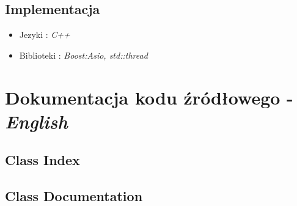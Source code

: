 \documentclass[11pt,oneside]{book}
\newcommand{\+}{\discretionary{\mbox{\scriptsize$\hookleftarrow$}}{}{}}
\begin{document}
\chapter{Implementacja}
\begin{itemize}
\item
Jezyki : \textsl{C++}
\item
Biblioteki : \textsl{Boost:Asio, std::thread}
\end{itemize}

\part{Dokumentacja kodu źródłowego - \textit{English}}
\label{md_README}

\chapter{Class Index}

\chapter{Class Documentation}






















\end{document}
